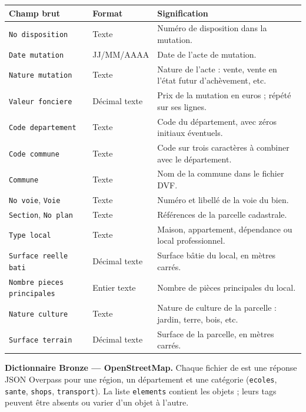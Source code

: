 \documentclass[11pt,a4paper]{article}
\begin{document}
\begin{center}
\small
\begin{tabular}{@{}p{4.8cm}p{2.5cm}p{7.6cm}@{}}
\toprule
Champ brut & Format & Signification \\
\midrule
\texttt{No disposition} & Texte & Numéro de disposition dans la mutation. \\
\texttt{Date mutation} & JJ/MM/AAAA & Date de l'acte de mutation. \\
\texttt{Nature mutation} & Texte & Nature de l'acte : vente, vente en l'état futur d'achèvement, etc. \\
\texttt{Valeur fonciere} & Décimal texte & Prix de la mutation en euros ; répété sur ses lignes. \\
\texttt{Code departement} & Texte & Code du département, avec zéros initiaux éventuels. \\
\texttt{Code commune} & Texte & Code sur trois caractères à combiner avec le département. \\
\texttt{Commune} & Texte & Nom de la commune dans le fichier DVF. \\
\texttt{No voie}, \texttt{Voie} & Texte & Numéro et libellé de la voie du bien. \\
\texttt{Section}, \texttt{No plan} & Texte & Références de la parcelle cadastrale. \\
\texttt{Type local} & Texte & Maison, appartement, dépendance ou local professionnel. \\
\texttt{Surface reelle bati} & Décimal texte & Surface bâtie du local, en mètres carrés. \\
\texttt{Nombre pieces principales} & Entier texte & Nombre de pièces principales du local. \\
\texttt{Nature culture} & Texte & Nature de culture de la parcelle : jardin, terre, bois, etc. \\
\texttt{Surface terrain} & Décimal texte & Surface de la parcelle, en mètres carrés. \\
\bottomrule
\end{tabular}
\end{center}

\noindent\textbf{Dictionnaire Bronze --- OpenStreetMap.} Chaque fichier de  est une réponse JSON Overpass pour une région, un département et une catégorie (\texttt{ecoles}, \texttt{sante}, \texttt{shops}, \texttt{transport}). La liste \texttt{elements} contient les objets ; leurs tags peuvent être absents ou varier d'un objet à l'autre.
\end{document}
